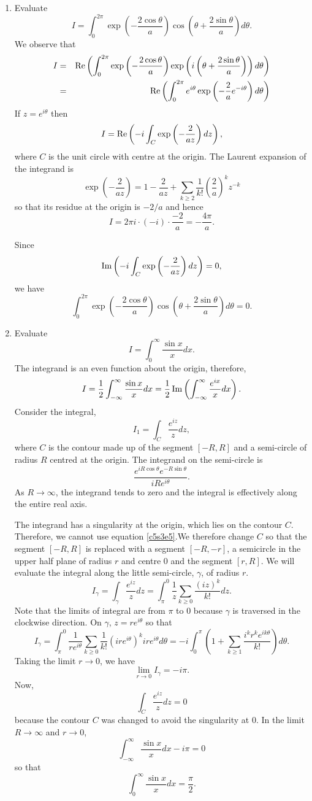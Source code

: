 \begin{enumerate}
\item Evaluate 
\[
I = \int_0^{2\pi}\exp\left(-\frac{2\cos\theta}{a}\right)
\cos\left(\theta + \frac{2\sin\theta}{a}\right)d\theta.
\]
We observe that
\begin{eqnarray*}
I &=& \operatorname{Re}\left(\int_0^{2\pi}\exp\left(-\frac{2\cos\theta}{a}\right)
\exp\left(i\left(\theta + \frac{2\sin\theta}{a}\right)\right)d\theta\right) \\
 &=& \operatorname{Re}\left(\int_0^{2\pi}e^{i\theta}\exp\left(-\frac{2}{a}e^{-i\theta}\right)d\theta\right)
\end{eqnarray*}
If $z = e^{i\theta}$ then
\[
I = \operatorname{Re}\left(-i\int_C\exp\left(-\frac{2}{az}\right) dz \right),
\]
where $C$ is the unit circle with centre at the origin. The Laurent expansion of
the integrand is
\[
\exp\left(-\frac{2}{az}\right) = 1 - \frac{2}{az} + \sum_{k \ge 2}\frac{1}{k!}\left(\frac{2}{a}\right)^kz^{-k}
\]
so that its residue at the origin is $-2/a$ and hence
\[
I = 2\pi i \cdot (-i) \cdot \frac{-2}{a} = -\frac{4\pi}{a}.
\]

Since
\[
\operatorname{Im}\left(-i\int_C\exp\left(-\frac{2}{az}\right) dz \right) = 0,
\]
we have
\[
\int_0^{2\pi}\exp\left(-\frac{2\cos\theta}{a}\right)
\cos\left(\theta + \frac{2\sin\theta}{a}\right)d\theta = 0.
\]

\item Evaluate
\[
I = \int_0^\infty \frac{\sin x}{x}dx.
\]
The integrand is an even function about the origin, therefore,
\[
I = \frac{1}{2}\int_{-\infty}^\infty \frac{\sin x}{x}dx =
\frac{1}{2}\operatorname{Im}\left(\int_{-\infty}^\infty \frac{e^{ix}}{x}dx\right).
\]
Consider the integral,
\[
I_1 = \int_C \frac{e^{iz}}{z}dz,
\]
where $C$ is the contour made up of the segment $[-R, R]$ and a semi-circle of
radius $R$ centred at the origin. The integrand on the semi-circle is
\[
\frac{e^{iR\cos\theta}e^{-R\sin\theta}}{iRe^{i\theta}}.
\]
As $R \rightarrow \infty$, the integrand tends to zero and the integral is
effectively along the entire real axis.

The integrand has a singularity at the origin, which lies on the contour $C$.
Therefore, we cannot use equation \eqref{c5s3e5}.We therefore change $C$ so that
the segment $[-R, R]$ is replaced with a segment $[-R, -r]$, a semicircle in
the upper half plane of radius $r$ and centre $0$ and the segment $[r, R]$. We
will evaluate the integral along the little semi-circle, $\gamma$, of radius 
$r$.
\[
I_\gamma = 
\int_\gamma \frac{e^{iz}}{z}dz = \int_{\pi}^0\frac{1}{z} 
\sum_{k \ge 0}\frac{(iz)^k}{k!} dz.
\]
Note that the limits of integral are from $\pi$ to $0$ because $\gamma$ is
traversed in the clockwise direction. On $\gamma$, $z = re^{i\theta}$ so that
\[
I_\gamma = \int_{\pi}^0 \frac{1}{re^{i\theta}}\sum_{k \ge 0}
\frac{1}{k!}(ire^{i\theta})^k ire^{i\theta}d\theta = 
-i\int_0^\pi \left(1 + \sum_{k \ge 1}\frac{i^k r^k e^{ik\theta}}{k!}\right)
d\theta.
\]
Taking the limit $r \rightarrow 0$, we have
\[
\lim_{r \rightarrow 0}I_\gamma = -i\pi.
\]
Now,
\[
\int_C \frac{e^{iz}}{z}dz = 0
\]
because the contour $C$ was changed to avoid the singularity at $0$. In the
limit $R \rightarrow \infty$ and $r \rightarrow 0$,
\[
\int_{-\infty}^\infty \frac{\sin x}{x}dx - i\pi = 0
\]
so that
\[
\int_0^\infty \frac{\sin x}{x}dx = \frac{\pi}{2}.
\]
\end{enumerate}
 
